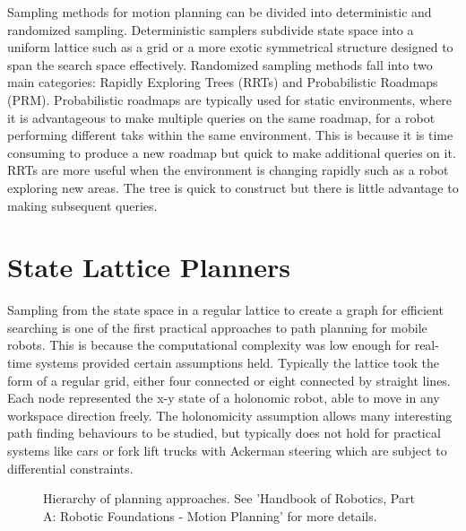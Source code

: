 \documentclass[11pt]{article} %
\begin{document}
Sampling methods for motion planning can be divided into deterministic and randomized sampling. Deterministic samplers subdivide state space into a uniform lattice such as a grid or a more exotic symmetrical structure designed to span the search space effectively. Randomized sampling methods fall into two main categories: Rapidly Exploring Trees (RRTs) \cite{Lavalle2001} and Probabilistic Roadmaps (PRM). Probabilistic roadmaps are typically used for static environments, where it is advantageous to make multiple queries on the same roadmap, for a robot performing different taks within the same environment. This is because it is time consuming to produce a new roadmap but quick to make additional queries on it. RRTs are more useful when the environment is changing rapidly such as a robot exploring new areas. The tree is quick to construct but there is little advantage to making subsequent queries.


\section{State Lattice Planners}
\label{sec:state_lattice_planners}
Sampling from the state space in a regular lattice to create a graph for efficient searching is one of the first practical approaches to path planning for mobile robots. This is because the computational complexity was low enough for real-time systems provided certain assumptions held. Typically the lattice took the form of a regular grid, either four connected or eight connected by straight lines. Each node represented the x-y state of a holonomic robot, able to move in any workspace direction freely. The holonomicity assumption allows many interesting path finding behaviours to be studied, but typically does not hold for practical systems like cars or fork lift trucks with Ackerman steering which are subject to differential constraints.

\begin{figure}
\centering
\def\svgwidth{1.0\columnwidth}

\caption{Hierarchy of planning approaches. See 'Handbook of Robotics, Part A: Robotic Foundations - Motion Planning' \cite{SicilianoKhatib2016} for more details.}
\end{figure}
\end{document}

